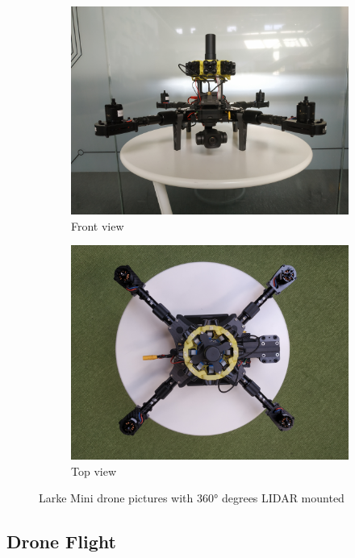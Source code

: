 \begin{figure}[H]
\begin{subfigure}[b]{0.475\textwidth}
        \centering 
        \includegraphics[width=\textwidth]{./projects/logviewer/drone_f_view.jpg}
        \caption{Front view}
    \end{subfigure}
    \hfill
    \begin{subfigure}[b]{0.475\textwidth}   
        \centering 
        \includegraphics[width=\textwidth]{./projects/logviewer/drone_t_view.jpg}
        \caption{Top view}
    \end{subfigure}
    \caption{Larke Mini drone pictures with 360° degrees LIDAR mounted} 
\end{figure}

\subsection{Drone Flight}

